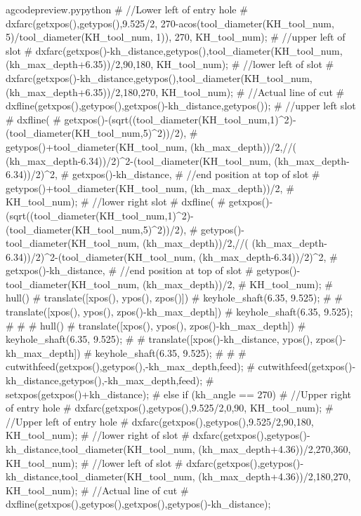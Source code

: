 \documentclass{ltxdoc}
\begin{document}
\begin{writecode}{a}{gcodepreview.py}{python}
{#    //Lower left of entry hole
#    dxfarc(getxpos(),getypos(),9.525/2, 270-acos(tool_diameter(KH_tool_num, 5)/tool_diameter(KH_tool_num, 1)), 270, KH_tool_num);
#    //upper left of slot
#    dxfarc(getxpos()-kh_distance,getypos(),tool_diameter(KH_tool_num, (kh_max_depth+6.35))/2,90,180, KH_tool_num);
#    //lower left of slot
#    dxfarc(getxpos()-kh_distance,getypos(),tool_diameter(KH_tool_num, (kh_max_depth+6.35))/2,180,270, KH_tool_num);
#    //Actual line of cut
#    dxfline(getxpos(),getypos(),getxpos()-kh_distance,getypos());
#    //upper left slot
#    dxfline(
#        getxpos()-(sqrt((tool_diameter(KH_tool_num,1)^2)-(tool_diameter(KH_tool_num,5)^2))/2), 
#        getypos()+tool_diameter(KH_tool_num, (kh_max_depth))/2,//( (kh_max_depth-6.34))/2)^2-(tool_diameter(KH_tool_num, (kh_max_depth-6.34))/2)^2,
#        getxpos()-kh_distance,
#    //end position at top of slot
#        getypos()+tool_diameter(KH_tool_num, (kh_max_depth))/2, 
#        KH_tool_num);
#    //lower right slot
#    dxfline(
#        getxpos()-(sqrt((tool_diameter(KH_tool_num,1)^2)-(tool_diameter(KH_tool_num,5)^2))/2), 
#        getypos()-tool_diameter(KH_tool_num, (kh_max_depth))/2,//( (kh_max_depth-6.34))/2)^2-(tool_diameter(KH_tool_num, (kh_max_depth-6.34))/2)^2,
#        getxpos()-kh_distance,
#    //end position at top of slot
#        getypos()-tool_diameter(KH_tool_num, (kh_max_depth))/2, 
#        KH_tool_num);
#    hull(){
#      translate([xpos(), ypos(), zpos()]){
#        keyhole_shaft(6.35, 9.525);
#      }
#      translate([xpos(), ypos(), zpos()-kh_max_depth]){
#        keyhole_shaft(6.35, 9.525);
#      }
#    }
#    hull(){
#      translate([xpos(), ypos(), zpos()-kh_max_depth]){
#        keyhole_shaft(6.35, 9.525);
#      }
#      translate([xpos()-kh_distance, ypos(), zpos()-kh_max_depth]){
#        keyhole_shaft(6.35, 9.525);
#      }
#    }
#    cutwithfeed(getxpos(),getypos(),-kh_max_depth,feed);
#    cutwithfeed(getxpos()-kh_distance,getypos(),-kh_max_depth,feed);
#    setxpos(getxpos()+kh_distance);
#  } else if (kh_angle == 270) {
#    //Upper right of entry hole
#    dxfarc(getxpos(),getypos(),9.525/2,0,90, KH_tool_num);
#    //Upper left of entry hole
#    dxfarc(getxpos(),getypos(),9.525/2,90,180, KH_tool_num);
#    //lower right of slot
#    dxfarc(getxpos(),getypos()-kh_distance,tool_diameter(KH_tool_num, (kh_max_depth+4.36))/2,270,360, KH_tool_num);
#    //lower left of slot
#    dxfarc(getxpos(),getypos()-kh_distance,tool_diameter(KH_tool_num, (kh_max_depth+4.36))/2,180,270, KH_tool_num);
#    //Actual line of cut
#    dxfline(getxpos(),getypos(),getxpos(),getypos()-kh_distance);
}
\end{writecode}
\end{document}
